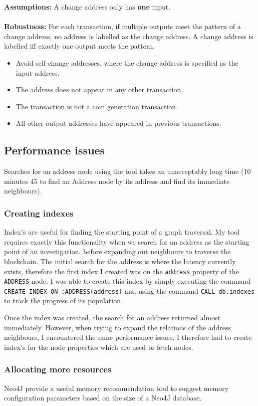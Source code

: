 \begin{itemize}
\textbf{Assumptions:} A change address only has \textbf{one} input. \\\\
\textbf{Robustness:} 
For each transaction, if multiple outputs meet the pattern of a change address, no address is labelled as the change address. A change address is labelled iff exactly one output meets the pattern. 
\begin{itemize}
    \item Avoid self-change addresses, where the change address is specified as the input address. 
    \item The address does not appear in any other transaction.
    \item The transaction is not a coin generation transaction. 
    \item All other output addresses have appeared in previous transactions.
\end{itemize}


 
\subsection{Performance issues} 
Searches for an address node using the tool takes an unacceptably long time (10 minutes 45 to find an Address node by its address and find its immediate neighbours). 

\subsubsection{Creating indexes}
Index's are useful for finding the starting point of a graph traversal. My tool requires exactly this functionality when we search for an address as the starting point of an investigation, before expanding out neighbours to traverse the blockchain. The initial search for the address is where the latency currently exists, therefore the first index I created was on the \texttt{address} property of the \texttt{ADDRESS} node. I was able to create this index by simply executing the command \texttt{CREATE INDEX ON :ADDRESS(address)} and using the command \texttt{CALL db.indexes} to track the progress of its population. 

Once the index was created, the search for an address returned almost immediately. However, when trying to expand the relations of the address neighbours, I encountered the same performance issues. I therefore had to create index's for the node properties which are used to fetch nodes.  


\subsubsection{Allocating more resources}
Neo4J provide a useful memory recommendation tool to suggest memory configuration parameters based on the size of a Neo4J database. 



    
    
\end{itemize}